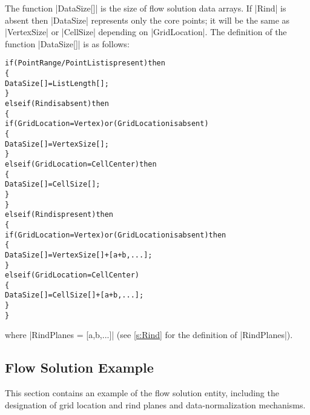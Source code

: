 The function |DataSize[]| is the size of flow solution data arrays.
If |Rind| is absent then |DataSize| represents only the core points;
it will be the same as |VertexSize| or |CellSize| depending on
|GridLocation|.
The definition of the function |DataSize[]| is as follows:
\begin{alltt}
  if (PointRange/PointList is present) then
    \{
    DataSize[] = ListLength[] ;
    \}
  else if (Rind is absent) then
    \{
    if (GridLocation = Vertex) or (GridLocation is absent)
      \{
      DataSize[] = VertexSize[] ;
      \}
    else if (GridLocation = CellCenter) then
      \{
      DataSize[] = CellSize[] ;
      \}
    \}
  else if (Rind is present) then
    \{
    if (GridLocation = Vertex) or (GridLocation is absent) then
      \{
      DataSize[] = VertexSize[] + [a + b,...] ;
      \}
    else if (GridLocation = CellCenter)
      \{
      DataSize[] = CellSize[] + [a + b,...] ;
      \}
    \}
\end{alltt}
where |RindPlanes = [a,b,...]| (see \autoref{s:Rind} 
for the definition of |RindPlanes|). 

\subsection{Flow Solution Example}
\label{s:flow_example}

This section contains an example of the flow solution entity, including
the designation of grid location and rind planes and data-normalization
mechanisms.

